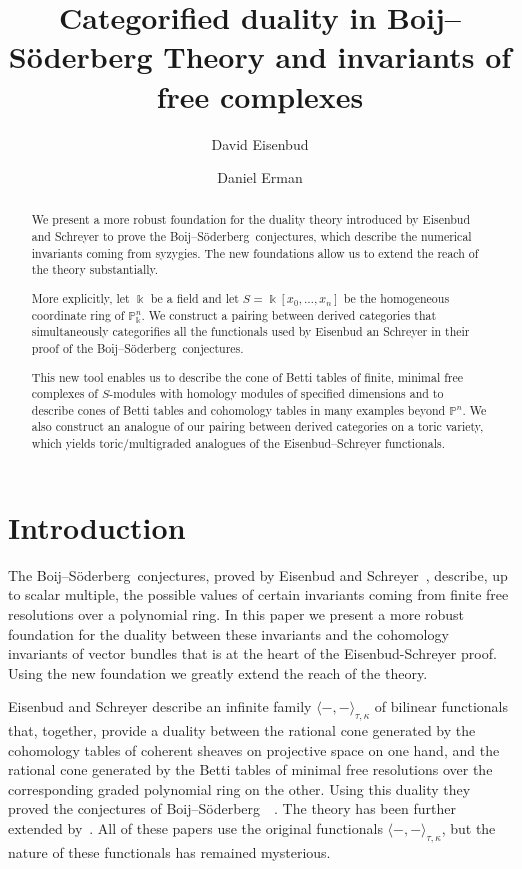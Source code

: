 \documentclass[12pt]{amsart}
\title{Categorified duality in Boij--S\"oderberg Theory and invariants of free complexes}
\author{David Eisenbud}
\author{Daniel Erman}\thanks{The first author was partially supported by an NSF grant, and the second author was partially supported by an NSF fellowship and by a Simons Foundation fellowship.}
\theoremstyle{definition}
\theoremstyle{remark}
\newcommand{\kk}{\Bbbk}
\newcommand{\PP}{\mathbb{P}}
\def\BS{Boij--S\"oderberg~}
\begin{document}
\begin{abstract} We present a more robust foundation for the duality theory introduced by Eisenbud and Schreyer to prove the \BS conjectures, which describe the numerical invariants coming from syzygies.
The new foundations allow us to extend the reach of the theory substantially.

More explicitly, let $\kk$ be a field and let $S = \kk[x_{0}, \dots,x_{n}]$ be the homogeneous coordinate ring of $\PP^{n}_{\kk}$.
We construct a pairing between derived categories that
simultaneously categorifies all the functionals used by Eisenbud an Schreyer in their proof of the \BS conjectures.

This new tool enables us to describe the cone of Betti tables of finite, minimal free complexes of $S$-modules with homology modules of specified dimensions and  to describe cones of Betti tables and cohomology tables in many examples beyond $\PP^n$. We also construct an analogue of our pairing between derived categories on a toric variety, which yields toric/multigraded analogues of the Eisenbud--Schreyer functionals.
\end{abstract}

\maketitle

\tableofcontents


\section*{Introduction}
The \BS conjectures, proved by Eisenbud and Schreyer~\cite{eis-schrey1}, describe, up to scalar multiple, the possible values of certain invariants coming from finite free resolutions over a polynomial ring. In this paper we present a more robust foundation for the duality between these invariants and the cohomology invariants of vector bundles that is at the heart of the Eisenbud-Schreyer proof. Using the new foundation we greatly extend the reach of the theory.

Eisenbud and Schreyer \cite{eis-schrey1} describe an infinite family $\langle -,-\rangle_{\tau,\kappa}$ of bilinear functionals that, together, provide a duality between the rational cone generated by the cohomology tables of coherent sheaves on projective space on one hand,  and the rational cone generated by the Betti tables of minimal free resolutions over the corresponding graded polynomial ring on the other. 
Using this duality they proved the conjectures of \BS~\cite{boij-sod1}. The theory has been further extended by~\cites{boij-sod2,eis-schrey2}. All of these papers use the original functionals $\langle -,-\rangle_{\tau,\kappa}$, but the nature of these functionals has remained mysterious. 
\end{document}
